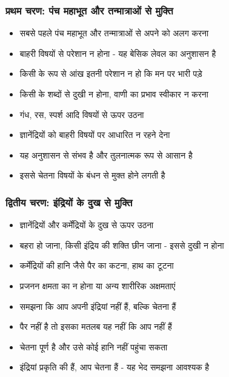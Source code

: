 \begin{frame}[fragile]\frametitle{प्रथम चरण: पंच महाभूत और तन्मात्राओं से मुक्ति}
      \begin{itemize}
          \item सबसे पहले पंच महाभूत और तन्मात्राओं से अपने को अलग करना
          \item बाहरी विषयों से परेशान न होना - यह बेसिक लेवल का अनुशासन है
          \item किसी के रूप से आंख इतनी परेशान न हो कि मन पर भारी पड़े
          \item किसी के शब्दों से दुखी न होना, वाणी का प्रभाव स्वीकार न करना
          \item गंध, रस, स्पर्श आदि विषयों से ऊपर उठना
          \item ज्ञानेंद्रियों को बाहरी विषयों पर आधारित न रहने देना
          \item यह अनुशासन से संभव है और तुलनात्मक रूप से आसान है
          \item इससे चेतना विषयों के बंधन से मुक्त होने लगती है
      \end{itemize}
\end{frame}

\begin{frame}[fragile]\frametitle{द्वितीय चरण: इंद्रियों के दुख से मुक्ति}
      \begin{itemize}
          \item ज्ञानेंद्रियों और कर्मेंद्रियों के दुख से ऊपर उठना
          \item बहरा हो जाना, किसी इंद्रिय की शक्ति छीन जाना - इससे दुखी न होना
          \item कर्मेंद्रियों की हानि जैसे पैर का कटना, हाथ का टूटना
          \item प्रजनन क्षमता का न होना या अन्य शारीरिक अक्षमताएं
          \item समझना कि आप अपनी इंद्रियां नहीं हैं, बल्कि चेतना हैं
          \item पैर नहीं है तो इसका मतलब यह नहीं कि आप नहीं हैं
          \item चेतना पूर्ण है और उसे कोई हानि नहीं पहुंचा सकता
          \item इंद्रियां प्रकृति की हैं, आप चेतना हैं - यह भेद समझना आवश्यक है
      \end{itemize}
\end{frame}

